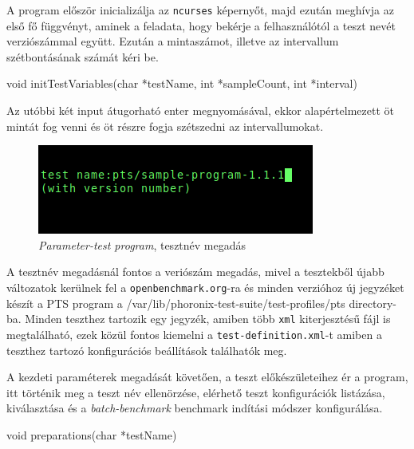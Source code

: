 
A program először inicializálja az \texttt{ncurses} képernyőt, majd ezután meghívja az első fő függvényt, aminek a feladata, hogy bekérje a felhasználótól a teszt nevét verziószámmal együtt. Ezután a mintaszámot, illetve az intervallum szétbontásának számát kéri be.  

\begin{cpp}
void initTestVariables(char *testName, int *sampleCount, int *interval)
\end{cpp}

Az utóbbi két input átugorható enter megnyomásával, ekkor alapértelmezett öt mintát fog venni és öt részre fogja szétszedni az intervallumokat.

\begin{figure}[h!]
\centering
\includegraphics[scale=3.0]{images/parameter-testInit.png}
\caption{\textit{Parameter-test program}, tesztnév megadás}
\label{fig:parameter-testInit}
\end{figure}

A tesztnév megadásnál fontos a veriószám megadás, mivel a tesztekből újabb változatok kerülnek fel a \texttt{openbenchmark.org}-ra és minden verzióhoz új jegyzéket készít a PTS program a /var/lib/phoronix-test-suite/test-profiles/pts directory-ba.
Minden teszthez tartozik egy jegyzék, amiben több \texttt{xml} kiterjesztésű fájl is megtalálható, ezek közül fontos kiemelni a \texttt{test-definition.xml}-t amiben a teszthez tartozó konfigurációs beállítások találhatók meg.

A kezdeti paraméterek megadását követően, a teszt előkészületeihez ér a program, itt történik meg a teszt név ellenörzése, elérhető teszt konfigurációk listázása, kiválasztása és a \textit{batch-benchmark} benchmark indítási módszer konfigurálása. 
\begin{cpp}
void preparations(char *testName)
\end{cpp}

